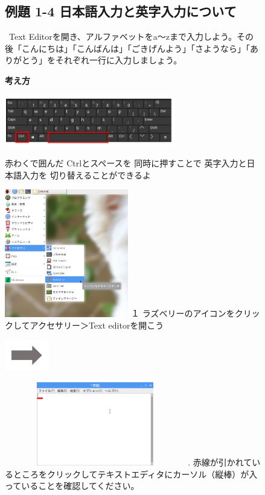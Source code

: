 \documentclass[a4paper,12pt]{jarticle}
\begin{document}
\clearpage
\begin{figure}[ht]
  \subsection{例題 1-4
    日本語入力と英字入力について}
  \ Text
  Editorを開き、アルファベットをa〜zまで入力しよう。その後「こんにちは」「こんばんは」「ごきげんよう」「さようなら」「ありがとう」をそれぞれ一行に入力しましょう。

  {\bf\large 考え方}


  \centering
  \begin{minipage}{\textwidth}
    \includegraphics[width=7.459cm,height=2.245cm]{textbook-img065.png}
    \raisebox{10mm}
    {
      \begin{minipage}{0.5\textwidth}
        赤わくで囲んだ
        Ctrlとスペースを
        同時に押すことで
        英字入力と日本語入力を
        切り替えることができるよ
      \end{minipage}
    }
  \end{minipage}

  \begin{minipage}{6.984cm}
    \includegraphics[width=5.408cm,height=5.595cm]{textbook-img064.png}
    \flushleft
    １
    ラズベリーのアイコンをクリックしてアクセサリー＞Text
    editorを開こう
  \end{minipage}
  \includegraphics[width=1.919cm,height=1.365cm]{textbook-img053.png}
  \begin{minipage}{7.347cm}
    \includegraphics[width=7.897cm,height=3.655cm]{textbook-img063.png}
    .
    赤線が引かれているところをクリックしてテキストエディタにカーソル（縦棒）が入っていることを確認してください。
  \end{minipage}


\end{figure}
\end{document}
